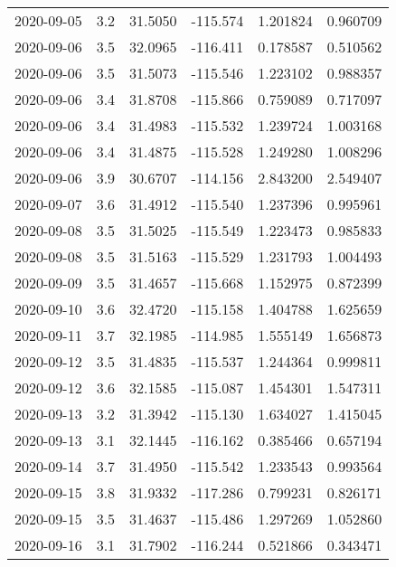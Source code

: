 \begin{tabular}{lrrrrr}
2020-09-05 &       3.2 &  31.5050 &  -115.574 &         1.201824 &         0.960709 \\
2020-09-06 &       3.5 &  32.0965 &  -116.411 &         0.178587 &         0.510562 \\
2020-09-06 &       3.5 &  31.5073 &  -115.546 &         1.223102 &         0.988357 \\
2020-09-06 &       3.4 &  31.8708 &  -115.866 &         0.759089 &         0.717097 \\
2020-09-06 &       3.4 &  31.4983 &  -115.532 &         1.239724 &         1.003168 \\
2020-09-06 &       3.4 &  31.4875 &  -115.528 &         1.249280 &         1.008296 \\
2020-09-06 &       3.9 &  30.6707 &  -114.156 &         2.843200 &         2.549407 \\
2020-09-07 &       3.6 &  31.4912 &  -115.540 &         1.237396 &         0.995961 \\
2020-09-08 &       3.5 &  31.5025 &  -115.549 &         1.223473 &         0.985833 \\
2020-09-08 &       3.5 &  31.5163 &  -115.529 &         1.231793 &         1.004493 \\
2020-09-09 &       3.5 &  31.4657 &  -115.668 &         1.152975 &         0.872399 \\
2020-09-10 &       3.6 &  32.4720 &  -115.158 &         1.404788 &         1.625659 \\
2020-09-11 &       3.7 &  32.1985 &  -114.985 &         1.555149 &         1.656873 \\
2020-09-12 &       3.5 &  31.4835 &  -115.537 &         1.244364 &         0.999811 \\
2020-09-12 &       3.6 &  32.1585 &  -115.087 &         1.454301 &         1.547311 \\
2020-09-13 &       3.2 &  31.3942 &  -115.130 &         1.634027 &         1.415045 \\
2020-09-13 &       3.1 &  32.1445 &  -116.162 &         0.385466 &         0.657194 \\
2020-09-14 &       3.7 &  31.4950 &  -115.542 &         1.233543 &         0.993564 \\
2020-09-15 &       3.8 &  31.9332 &  -117.286 &         0.799231 &         0.826171 \\
2020-09-15 &       3.5 &  31.4637 &  -115.486 &         1.297269 &         1.052860 \\
2020-09-16 &       3.1 &  31.7902 &  -116.244 &         0.521866 &         0.343471 \\

\end{tabular}
